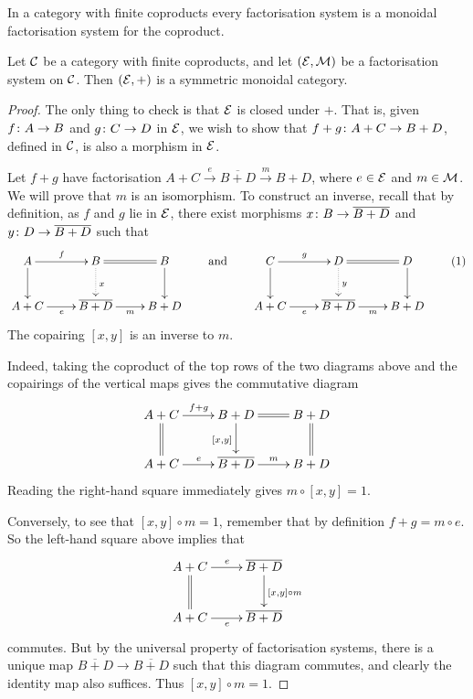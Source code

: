 In a category with finite coproducts every factorisation system is a monoidal
factorisation system for the coproduct.
\begin{lemma} \label{lem.monfact}
  Let $\mathcal C$ be a category with finite coproducts, and let $(\mathcal E, \mathcal M)$ be a
  factorisation system on $\mathcal C$. Then $(\mathcal E,+)$ is a symmetric monoidal
  category.
\end{lemma}
\begin{proof}
  The only thing to check is that $\mathcal E$ is closed under $+$. That is, given
  $f{\colon} A \to B$ and $g{\colon} C \to D$ in $\mathcal E$, we wish to show that
  $f+g{\colon} A+C \to B+D$, defined in $\mathcal C$, is also a morphism in $\mathcal E$. 

  Let $f+g$ have factorisation $A+C \stackrel{e}\longrightarrow \overline{B+D}
  \stackrel{m}\longrightarrow B+D$, where $e \in \mathcal E$ and $m \in \mathcal
  M$. We will prove that $m$ is an isomorphism. To construct an inverse, recall
  that by definition, as $f$ and $g$ lie in $\mathcal E$, there exist morphisms
  $x{\colon} B \to \overline{B+D}$ and $y{\colon} D \to \overline{B+D}$ such that
  \[ \label{eq.coreltensor}
    \xymatrixcolsep{2pc}
    \xymatrixrowsep{2pc}
    \xymatrix{
      A \ar[r]^f \ar[d] & B \ar@{=}[r] \ar@{.>}[d]^x & B
      \ar[d] \\
      A+C \ar[r]_{e}&\overline{B+D} \ar[r]_{m} & B+D
    }
    \qquad \mbox{and} \qquad
    \xymatrixcolsep{2pc}
    \xymatrixrowsep{2pc}
    \xymatrix{
      C \ar[r]^g \ar[d] & D \ar@{=}[r] \ar@{.>}[d]^y & D
      \ar[d] \\
      A+C \ar[r]_{e}&\overline{B+D} \ar[r]_{m} & B+D
    }
    \tag{1}
  \]
  The copairing $[x,y]$ is an inverse to $m$. 
  
  Indeed, taking the coproduct of the top rows of the two diagrams above and the
  copairings of the vertical maps gives the commutative diagram
  \[
    \xymatrix{
      A+C \ar[r]^{f+g} \ar@{=}[d] & B+D \ar@{=}[r] \ar[d]_{[x,y]} & B+D \ar@{=}[d] \\
      A+C \ar[r]^{e} & \overline{B+D} \ar[r]^{m} & B+D
    }
  \]
  Reading the right-hand square immediately gives $m \circ [x,y] =1$.
  
  Conversely, to see that $[x,y] \circ m = 1$, remember that by definition $f+g
  = m \circ e$. So the left-hand square above implies that
  \[
    \xymatrixcolsep{2pc}
    \xymatrixrowsep{2pc}
    \xymatrix{
      A+C \ar[r]^e \ar@{=}[d] & \overline{B+D} \ar[d]^{[x,y] \circ m} \\
      A+C \ar[r]_{e}&\overline{B+D} 
    }
  \]
  commutes. But by the universal property of factorisation systems, there is a
  unique map $\overline{B+D} \to \overline{B+D}$ such that this diagram
  commutes, and clearly the identity map also suffices. Thus $[x,y] \circ m =
  1$.
\end{proof}


